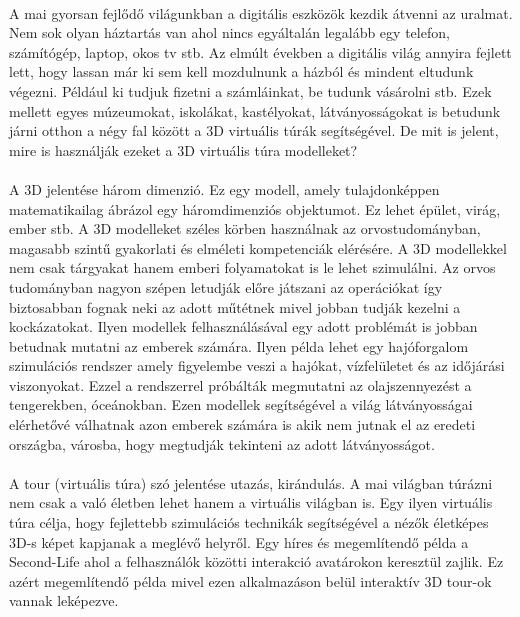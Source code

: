 	\paragraph{}
A mai gyorsan fejlődő világunkban a digitális eszközök kezdik átvenni az uralmat. Nem sok olyan háztartás van ahol nincs egyáltalán legalább egy telefon, számítógép, laptop, okos tv stb. Az elmúlt években a digitális világ annyira fejlett lett, hogy lassan már ki sem kell mozdulnunk a házból és mindent eltudunk végezni. Például ki tudjuk fizetni a számláinkat, be tudunk vásárolni stb. Ezek mellett egyes múzeumokat, iskolákat, kastélyokat, látványosságokat is betudunk járni otthon a négy fal között a 3D virtuális túrák segítségével. De mit is jelent, mire is használják ezeket a 3D virtuális túra modelleket?
\paragraph{}
A 3D jelentése három dimenzió. Ez egy modell, amely tulajdonképpen matematikailag ábrázol egy háromdimenziós objektumot. Ez lehet épület, virág, ember stb. A 3D modelleket széles körben használnak az orvostudományban, magasabb szintű gyakorlati és elméleti kompetenciák elérésére. A 3D modellekkel nem csak tárgyakat hanem emberi folyamatokat is le lehet szimulálni. Az orvos tudományban nagyon szépen letudják előre játszani az operációkat így biztosabban fognak neki az adott műtétnek mivel jobban tudják kezelni a kockázatokat. Ilyen modellek felhasználásával egy adott problémát is jobban betudnak mutatni az emberek számára. Ilyen példa lehet egy hajóforgalom szimulációs rendszer amely figyelembe veszi a hajókat, vízfelületet és az időjárási viszonyokat. Ezzel a rendszerrel próbálták megmutatni az olajszennyezést a tengerekben, óceánokban.\cite{dedov2017design} Ezen modellek segítségével a világ látványosságai elérhetővé válhatnak azon emberek számára is akik nem jutnak el az eredeti országba, városba, hogy megtudják tekinteni az adott látványosságot.
\paragraph{}
A tour (virtuális túra) szó jelentése utazás, kirándulás. A mai világban túrázni nem csak a való életben lehet hanem a virtuális világban is. Egy ilyen virtuális túra célja, hogy fejlettebb szimulációs technikák segítségével a nézők életképes 3D-s képet kapjanak a meglévő helyről. Egy híres és megemlítendő példa a Second-Life ahol a felhasználók közötti interakció avatárokon keresztül zajlik. Ez azért megemlítendő példa mivel ezen alkalmazáson belül interaktív 3D tour-ok vannak leképezve.\cite{moloo20163d}
